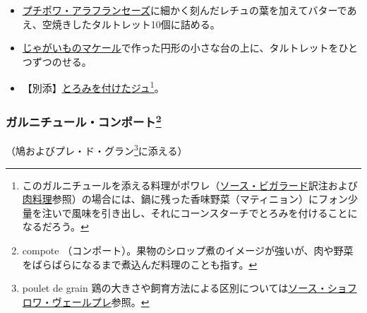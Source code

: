 \begin{recette}
\begin{itemize}
\item
  \protect\hyperlink{petits-pois-francaise}{プチポワ・アラフランセーズ}に細かく刻んだレチュの葉を加えてバターであえ、空焼きしたタルトレット10個に詰める。
\item
  \protect\hyperlink{pommes-de-terre-macaire}{じゃがいものマケール}で作った円形の小さな台の上に、タルトレットをひとつずつのせる。
\item
  【別添】\protect\hyperlink{jus-de-veau-lie}{とろみを付けたジュ}\footnote{このガルニチュールを添える料理がポワレ（\protect\hyperlink{sauce-bigarade}{ソース・ビガラード}訳注および\protect\hyperlink{releves-et-entrees}{肉料理}参照）の場合には、鍋に残った香味野菜（マティニョン）にフォン少量を注いで風味を引き出し、それにコーンスターチでとろみを付けることになるだろう。}。
\end{itemize}

\atoaki{}

\hypertarget{garniture-de-compote}{%
\subsubsection[ガルニチュール・コンポート]{\texorpdfstring{ガルニチュール・コンポート\footnote{compote
  （コンポート）。果物のシロップ煮のイメージが強いが、肉や野菜をばらばらになるまで煮込んだ料理のことも指す。}}{ガルニチュール・コンポート}}\label{garniture-de-compote}}



（鳩およびプレ・ド・グラン\footnote{poulet de grain
  鶏の大きさや飼育方法による区別については\protect\hyperlink{sauce-chaud-froid-vert-pre}{ソース・ショフロワ・ヴェールプレ}参照。}に添える）


\end{recette}
